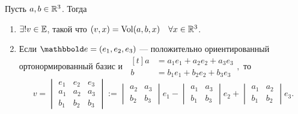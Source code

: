 \begin{theorem}
    \label{lec25:t}
    Пусть $a, b \in \mathbb{R}^3$. Тогда
    \begin{enumerate}
    \item $\exists! v \in \mathbb{E}$, такой что $(v, x) = \operatorname{\mathop{\mathrm{Vol}}}(a, b, x) \quad \forall x \in \mathbb{R}^3$.
    \item Если $\E = (e_1, e_2, e_3)$ --- положительно ориентированный ортонормированный базис и
        \begin{math}
            \ \begin{aligned}[t]
                a &= a_1 e_1 + a_2 e_2 + a_3 e_3 \\
                b &= b_1 e_1 + b_2 e_2 + b_3 e_3
            \end{aligned},
        \end{math}
        то 
        \begin{equation}
            \tag{$\star$}
            \label{lec25:v}
            v = \begin{vmatrix}
                e_1 & e_2 & e_3 \\
                a_1 & a_2 & a_3 \\
                b_1 & b_2 & b_3
            \end{vmatrix}
            := \begin{vmatrix} 
                a_2 & a_3 \\
                b_2 & b_3
            \end{vmatrix} e_1 - \begin{vmatrix} 
                a_1 & a_3 \\
                b_1 & b_3
            \end{vmatrix} e_2 + \begin{vmatrix} 
                a_1 & a_2 \\
                b_1 & b_2
            \end{vmatrix} e_3
        .\end{equation}
    \end{enumerate}
\end{theorem}

